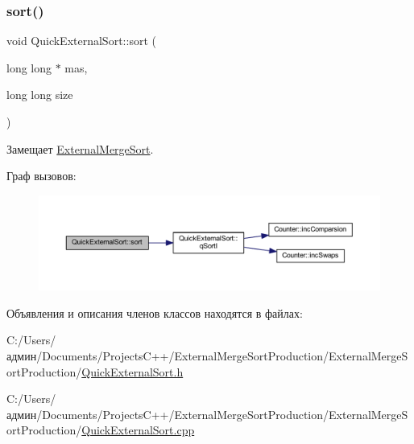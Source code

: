 \subsubsection{\texorpdfstring{sort()}{sort()}}
{\footnotesize\ttfamily void Quick\+External\+Sort\+::sort (\begin{DoxyParamCaption}\item[{long long $\ast$}]{mas,  }\item[{long long}]{size }\end{DoxyParamCaption})\hspace{0.3cm}{\ttfamily [virtual]}}



Замещает \hyperlink{class_external_merge_sort_af6412221cc797a846243a343ccc12dba}{External\+Merge\+Sort}.

Граф вызовов\+:\nopagebreak
\begin{figure}[H]
\begin{center}
\leavevmode
\includegraphics[width=350pt]{class_quick_external_sort_adafdd4faded04218c1a131bf55e3c90d_cgraph}
\end{center}
\end{figure}


Объявления и описания членов классов находятся в файлах\+:\begin{DoxyCompactItemize}
\item 
C\+:/\+Users/админ/\+Documents/\+Projects\+C++/\+External\+Merge\+Sort\+Production/\+External\+Merge\+Sort\+Production/\hyperlink{_quick_external_sort_8h}{Quick\+External\+Sort.\+h}\item 
C\+:/\+Users/админ/\+Documents/\+Projects\+C++/\+External\+Merge\+Sort\+Production/\+External\+Merge\+Sort\+Production/\hyperlink{_quick_external_sort_8cpp}{Quick\+External\+Sort.\+cpp}\end{DoxyCompactItemize}
